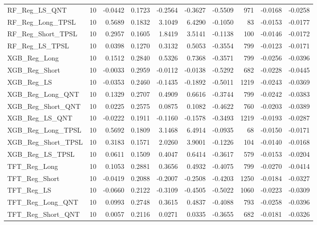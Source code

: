 \begin{tabular}{llrrrrrrrr}
\cline{1-10}
RF\_Reg\_LS\_QNT & 10 & -0.0442 & 0.1723 & -0.2564 & -0.3627 & -0.5509 & 971 & -0.0168 & -0.0258 \\
\cline{1-10}
RF\_Reg\_Long\_TPSL & 10 & 0.5689 & 0.1832 & 3.1049 & 6.4290 & -0.1050 & 83 & -0.0153 & -0.0177 \\
\cline{1-10}
RF\_Reg\_Short\_TPSL & 10 & 0.2957 & 0.1605 & 1.8419 & 3.5141 & -0.1138 & 100 & -0.0146 & -0.0172 \\
\cline{1-10}
RF\_Reg\_LS\_TPSL & 10 & 0.0398 & 0.1270 & 0.3132 & 0.5053 & -0.3554 & 799 & -0.0123 & -0.0171 \\
\cline{1-10}
XGB\_Reg\_Long & 10 & 0.1512 & 0.2840 & 0.5326 & 0.7368 & -0.3571 & 799 & -0.0256 & -0.0396 \\
\cline{1-10}
XGB\_Reg\_Short & 10 & -0.0033 & 0.2959 & -0.0112 & -0.0138 & -0.5292 & 682 & -0.0228 & -0.0445 \\
\cline{1-10}
XGB\_Reg\_LS & 10 & -0.0353 & 0.2460 & -0.1435 & -0.1892 & -0.5011 & 1219 & -0.0243 & -0.0369 \\
\cline{1-10}
XGB\_Reg\_Long\_QNT & 10 & 0.1329 & 0.2707 & 0.4909 & 0.6616 & -0.3744 & 799 & -0.0242 & -0.0383 \\
\cline{1-10}
XGB\_Reg\_Short\_QNT & 10 & 0.0225 & 0.2575 & 0.0875 & 0.1082 & -0.4622 & 760 & -0.0203 & -0.0389 \\
\cline{1-10}
XGB\_Reg\_LS\_QNT & 10 & -0.0222 & 0.1911 & -0.1160 & -0.1578 & -0.3493 & 1219 & -0.0193 & -0.0287 \\
\cline{1-10}
XGB\_Reg\_Long\_TPSL & 10 & 0.5692 & 0.1809 & 3.1468 & 6.4914 & -0.0935 & 68 & -0.0150 & -0.0171 \\
\cline{1-10}
XGB\_Reg\_Short\_TPSL & 10 & 0.3183 & 0.1571 & 2.0260 & 3.9001 & -0.1226 & 104 & -0.0140 & -0.0168 \\
\cline{1-10}
XGB\_Reg\_LS\_TPSL & 10 & 0.0611 & 0.1509 & 0.4047 & 0.6414 & -0.3617 & 579 & -0.0153 & -0.0204 \\
\cline{1-10}
TFT\_Reg\_Long & 10 & 0.1053 & 0.2881 & 0.3656 & 0.4932 & -0.4075 & 799 & -0.0270 & -0.0414 \\
\cline{1-10}
TFT\_Reg\_Short & 10 & -0.0419 & 0.2088 & -0.2007 & -0.2508 & -0.4203 & 1250 & -0.0184 & -0.0327 \\
\cline{1-10}
TFT\_Reg\_LS & 10 & -0.0660 & 0.2122 & -0.3109 & -0.4505 & -0.5022 & 1060 & -0.0223 & -0.0309 \\
\cline{1-10}
TFT\_Reg\_Long\_QNT & 10 & 0.0993 & 0.2748 & 0.3615 & 0.4837 & -0.4088 & 793 & -0.0258 & -0.0396 \\
\cline{1-10}
TFT\_Reg\_Short\_QNT & 10 & 0.0057 & 0.2116 & 0.0271 & 0.0335 & -0.3655 & 682 & -0.0181 & -0.0326 \\

\end{tabular}
